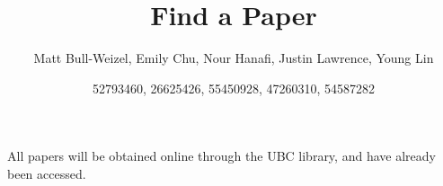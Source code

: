 \documentclass{article}
\title{Find a Paper}
\author{Matt Bull-Weizel, Emily Chu, Nour Hanafi, Justin Lawrence, Young Lin}
\date{52793460, 26625426, 55450928, 47260310, 54587282}
\begin{document}
\maketitle

\nocite{*}



All papers will be obtained online through the UBC library, and have already been accessed.
\end{document}
